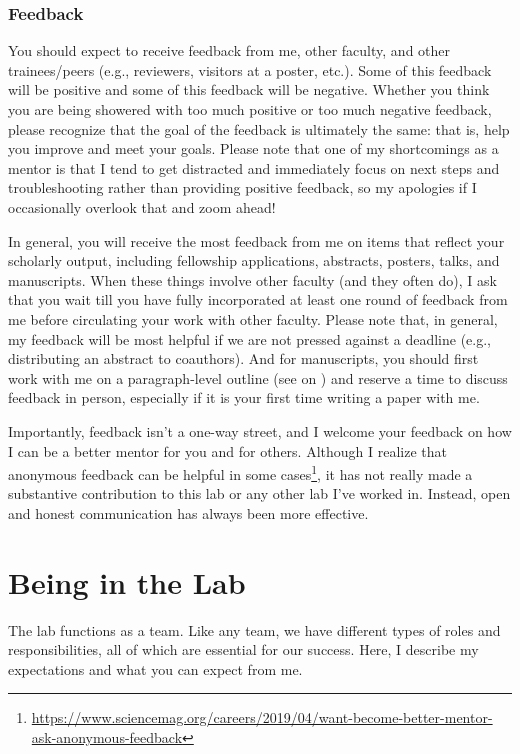 \documentclass[letterpaper,11pt,oneside]{memoir}
\begin{document}
\subsection{Feedback}
You should expect to receive feedback from me, other faculty, and other trainees/peers (e.g., reviewers, visitors at a poster, etc.). Some of this feedback will be positive and some of this feedback will be negative. Whether you think you are being showered with too much positive or too much negative feedback, please recognize that the goal of the feedback is ultimately the same: that is, help you improve and meet your goals. Please note that one of my shortcomings as a mentor is that I tend to get distracted and immediately focus on next steps and troubleshooting rather than providing positive feedback, so my apologies if I occasionally overlook that and zoom ahead!

In general, you will receive the most feedback from me on items that reflect your scholarly output, including fellowship applications, abstracts, posters, talks, and manuscripts. When these things involve other faculty (and they often do), I ask that you wait till you have fully incorporated at least one round of feedback from me before circulating your work with other faculty. Please note that, in general, my feedback will be most helpful if we are not pressed against a deadline (e.g., distributing an abstract to coauthors). And for manuscripts, you should first work with me on a paragraph-level outline (see  on ) and reserve a time to discuss feedback in person, especially if it is your first time writing a paper with me.

Importantly, feedback isn't a one-way street, and I welcome your feedback on how I can be a better mentor for you and for others. Although I realize that anonymous feedback can be helpful in some cases\footnote{\url{https://www.sciencemag.org/careers/2019/04/want-become-better-mentor-ask-anonymous-feedback}}, it has not really made a substantive contribution to this lab or any other lab I've worked in. Instead, open and honest communication has always been more effective. 




\chapter{Being in the Lab}

The lab functions as a team. Like any team, we have different types of roles and responsibilities, all of which are essential for our success. Here, I describe my expectations and what you can expect from me. 
\end{document}
